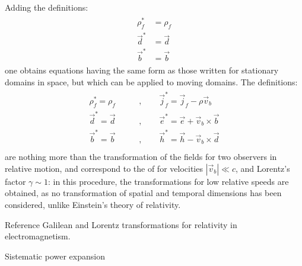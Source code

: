 \documentclass[letterpaper,10pt,english]{jupyterBook}
\begin{document}
\sphinxAtStartPar
Adding the definitions:
\begin{equation*}
\begin{split}\begin{aligned}
  \rho^*_f  &  = \rho_f  \\
  \vec{d}^* &  = \vec{d}  \\
  \vec{b}^* &  = \vec{b}
\end{aligned}\end{split}
\end{equation*}
\sphinxAtStartPar
one obtains equations having the same form as those written for stationary domains in space, but which can be applied to moving domains. The definitions:
\begin{equation*}
\begin{split}\begin{aligned}
\rho^*_f = \rho_f   \qquad & , \qquad \vec{j}^*_f = \vec{j}_f - \rho \vec{v}_b \\
\vec{d}^* = \vec{d} \qquad & , \qquad \vec{e}^* = \vec{e} + \vec{v}_b \times \vec{b} \\
\vec{b}^* = \vec{b} \qquad & , \qquad \vec{h}^* = \vec{h} - \vec{v}_b \times \vec{d} \\
\end{aligned}\end{split}
\end{equation*}
\sphinxAtStartPar
are nothing more than the transformation of the fields for two observers in relative motion, and correspond to the  of  for velocities \(|\vec{v}_b| \ll c\), and Lorentz’s factor \(\gamma \sim 1\): in this procedure, the transformations for low relative speeds are obtained, as no transformation of spatial and temporal dimensions has been considered, unlike Einstein’s theory of relativity.

\sphinxAtStartPar
{} Reference Galilean and Lorentz transformations for relativity in electromagnetism.

\sphinxAtStartPar
{} Sistematic power expansion
\end{document}
